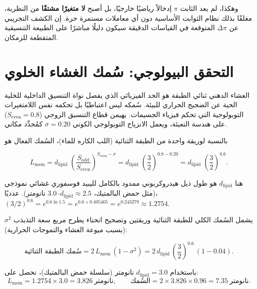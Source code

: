 \documentclass[11pt,a4paper]{article}
\begin{document}
	وهكذا، لم يعد الثابت \(\pi\) إدخالاً رياضيًا خارجيًا، بل أصبح \textbf{لا متغيرًا مشتقًا} من النظرية، مغلقًا بذلك نظام الثوابت الأساسية دون أي معاملات مستمرة حرة. إن الكشف التجريبي عن \(\Delta\pi\) المتوقعة في القياسات الدقيقة سيكون دليلًا مباشرًا على الطبيعة التنسيقية المتقطعة للزمكان.
	
	\section{التحقق البيولوجي: سُمك الغشاء الخلوي}
	\label{sec:bio-membrane}
	
	الغشاء الدهني ثنائي الطبقة هو الحد الفيزيائي الذي يفصل نواة التنسيق الداخلية للخلية الحية عن الضجيج الحراري للبيئة. سُمكه ليس اعتباطيًا بل تحكمه نفس اللامتغيرات التوبولوجية التي تحكم فيزياء الجسيمات. يهيمن قطاع التنسيق الزوجي (\(S_{\mathrm{even}} = 0.8\)) على هندسة التعبئة، ويعمل الانزياح التوبولوجي الكوني \(\sigma = 0.20\) كمُحدِّد مكاني.
	
	بالنسبة لوريقة واحدة من الطبقة الثنائية (اللب الكاره للماء)، السُمك الفعال هو
	
	\begin{equation}
		L_{\mathrm{mem}} = d_{\mathrm{lipid}} \;
		\left( \frac{S_{\mathrm{odd}}}{S_{\mathrm{even}}} \right)^{S_{\mathrm{even}} - \sigma}
		= d_{\mathrm{lipid}} \;
		\left( \frac{3}{2} \right)^{0.8 - 0.20}
		= d_{\mathrm{lipid}} \;
		\left( \frac{3}{2} \right)^{0.6}.
	\end{equation}
	
	هنا \(d_{\mathrm{lipid}}\) هو طول ذيل هيدروكربوني ممدود بالكامل لليبيد فوسفوري غشائي نموذجي (مثل حمض البالمتيك، \(d_{\mathrm{lipid}} \approx 2.5\)--\(3.0\) نانومتر). عدديًا، \((3/2)^{0.6} = e^{0.6\ln 1.5} = e^{0.6 \times 0.405465} = e^{0.243279} \approx 1.2754\).
	
	يشمل السُمك الكلي للطبقة الثنائية وريقتين وتصحيح انحناء يطرح مربع سعة التذبذب \(\sigma^2\) (بسبب ميوعة الغشاء والتموجات الحرارية):
	
	\begin{equation}
		\boxed{\text{سُمك الطبقة الثنائية} = 2 \, L_{\mathrm{mem}} \,
			(1 - \sigma^2) = 2 \, d_{\mathrm{lipid}} \,
			\left( \frac{3}{2} \right)^{0.6} \, (1 - 0.04)}.
	\end{equation}
	
	باستخدام \(d_{\mathrm{lipid}} = 3.0\) نانومتر (سلسلة حمض البالمتيك)، نحصل على:
	\[
	L_{\mathrm{mem}} = 1.2754 \times 3.0 = 3.826\ \text{نانومتر},
	\qquad
	\text{السُمك} = 2 \times 3.826 \times 0.96 = 7.35\ \text{نانومتر}.
	\]
	
\end{document}
